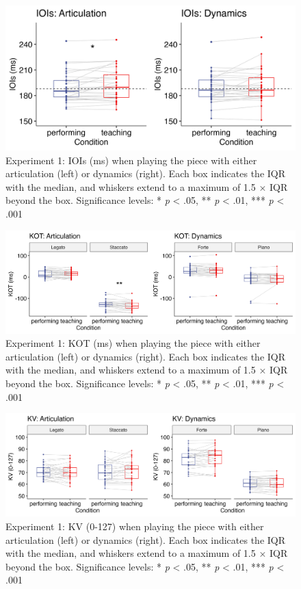 \documentclass[
  english,
  man,floatsintext]{apa6}
\begin{document}
\begin{figure}
\includegraphics[width=1\linewidth]{manuscript_files/figure-latex/plot-ioi-1-1} \caption{\label{fig:ioi-1}Experiment 1: IOIs (ms) when playing the piece with either articulation (left) or dynamics (right). Each box indicates the IQR with the median, and whiskers extend to a maximum of 1.5 × IQR beyond the box. Significance levels: * \textit{p} < .05, ** \textit{p} < .01, *** \textit{p} < .001}\label{fig:plot-ioi-1}
\end{figure}

\begin{figure}
\includegraphics[width=1\linewidth]{manuscript_files/figure-latex/plot-kot-1-1} \caption{\label{fig:kot-1}Experiment 1: KOT (ms) when playing the piece with either articulation (left) or dynamics (right). Each box indicates the IQR with the median, and whiskers extend to a maximum of 1.5 × IQR beyond the box. Significance levels: * \textit{p} < .05, ** \textit{p} < .01, *** \textit{p} < .001}\label{fig:plot-kot-1}
\end{figure}

\begin{figure}
\includegraphics[width=1\linewidth]{manuscript_files/figure-latex/plot-vel-1-1} \caption{\label{fig:vel-1}Experiment 1: KV (0-127) when playing the piece with either articulation (left) or dynamics (right). Each box indicates the IQR with the median, and whiskers extend to a maximum of 1.5 × IQR beyond the box. Significance levels: * \textit{p} < .05, ** \textit{p} < .01, *** \textit{p} < .001}\label{fig:plot-vel-1}
\end{figure}
\end{document}
